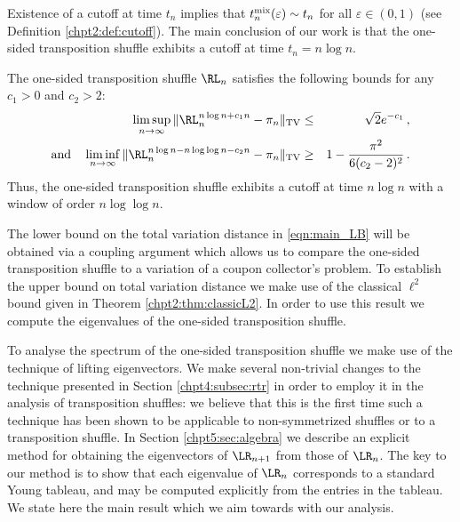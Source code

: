 \documentclass[11pt]{report}
\begin{document}
Existence of a cutoff at time $t_{n}$ implies that 
$t_n^{\textnormal{mix}}(\varepsilon) \sim t_n$ for all 
$\varepsilon\in(0,1)$ (see Definition \ref{chpt2:def:cutoff}). The main conclusion of our work 
is that the one-sided transposition shuffle exhibits a cutoff at time $t_n 
= n\log n$.
\begin{thm}
	\label{chpt5:thm:cutoff}
	The one-sided transposition shuffle $\RL_{n}$ satisfies the following bounds for any $c_{1}>0$ and $c_{2}>2$:
	\begin{eqnarray}
	\limsup_{n\rightarrow \infty} \,\lVert \RL_{n}^{n\log n+c_{1}n} - 
	\pi_{n} \rVert_{\textnormal{TV}} & \leq & 
	\sqrt 2e^{-c_{1}} \,, \label{eqn:main_UB}\\
	\text{and} \quad \liminf_{n\to\infty}\,\lVert \RL_{n}^{n\log n - 
		n\log\log n - c_{2}n} - 
	\pi_{n}
	\rVert_{\textnormal{TV}} 
	& \geq & 1 - \frac{\pi^{2}}{6(c_{2}-2)^{2}}\,.\label{eqn:main_LB}
	\end{eqnarray}
	Thus, the one-sided transposition shuffle exhibits a cutoff at time $n\log n$ with a window of order $n\log\log n$.
\end{thm}

The lower bound on the total variation distance in \eqref{eqn:main_LB} will be obtained 
via a coupling argument which allows us to compare the one-sided 
transposition shuffle to a variation of a coupon collector's problem. 
To establish the upper bound on total variation distance we make use of the classical $\ell^{2}$ bound given in Theorem \ref{chpt2:thm:classicL2}. In order to use this result we compute the eigenvalues of the one-sided 
transposition shuffle.







To analyse the spectrum of the one-sided 
transposition shuffle we make use of the technique of lifting eigenvectors.	We make several non-trivial changes to the technique presented in Section \ref{chpt4:subsec:rtr} in order to employ it in the analysis of transposition shuffles: we believe that this is the first time such a technique has been shown to be applicable to non-symmetrized shuffles or to a transposition shuffle. In Section \ref{chpt5:sec:algebra} we describe an explicit method for obtaining the eigenvectors of $\LR_{n+1}$ 
from those of $\LR_n$.	The key to our method is to show that each eigenvalue of $\LR_n$ corresponds to a 
standard Young tableau, and may be computed explicitly from the 
entries in the tableau. 
We state here the main 
result which we aim towards with our analysis. 
\end{document}
